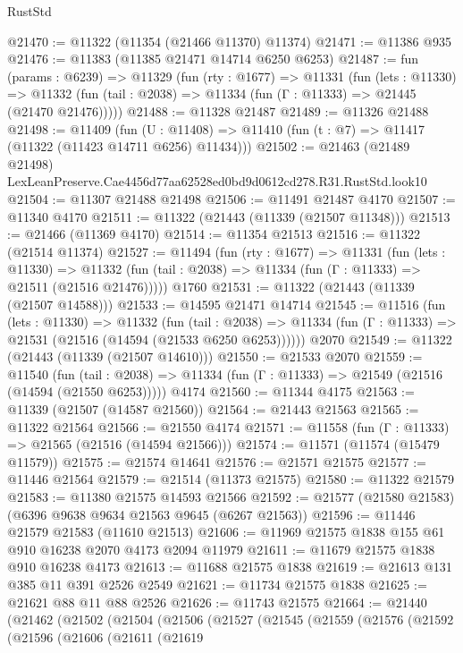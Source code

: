 \begin{lexlean}{RustStd}
\begin{coremodule}
@21470 := @11322 (@11354 (@21466 @11370) @11374)
@21471 := @11386 @935
@21476 := @11383 (@11385 @21471 @14714 @6250 @6253)
@21487 := fun (params : @6239) =>
  @11329
    (fun (rty : @1677) =>
    @11331
      (fun (lets : @11330) =>
      @11332 (fun (tail : @2038) => @11334 (fun (Γ : @11333) => @21445 (@21470 @21476)))))
@21488 := @11328 @21487
@21489 := @11326 @21488
@21498 := @11409
    (fun (U : @11408) => @11410 (fun (t : @7) => @11417 (@11322 (@11423 @14711 @6256) @11434)))
@21502 := @21463
    (@21489 @21498)
    LexLeanPreserve.Cae4456d77aa62528ed0bd9d0612cd278.R31.RustStd.look10
@21504 := @11307 @21488 @21498
@21506 := @11491 @21487 @4170
@21507 := @11340 @4170
@21511 := @11322 (@21443 (@11339 (@21507 @11348)))
@21513 := @21466 (@11369 @4170)
@21514 := @11354 @21513
@21516 := @11322 (@21514 @11374)
@21527 := @11494
    (fun (rty : @1677) =>
    @11331
      (fun (lets : @11330) =>
      @11332 (fun (tail : @2038) => @11334 (fun (Γ : @11333) => @21511 (@21516 @21476)))))
    @1760
@21531 := @11322 (@21443 (@11339 (@21507 @14588)))
@21533 := @14595 @21471 @14714
@21545 := @11516
    (fun (lets : @11330) =>
    @11332
      (fun (tail : @2038) =>
      @11334 (fun (Γ : @11333) => @21531 (@21516 (@14594 (@21533 @6250 @6253))))))
    @2070
@21549 := @11322 (@21443 (@11339 (@21507 @14610)))
@21550 := @21533 @2070
@21559 := @11540
    (fun (tail : @2038) => @11334 (fun (Γ : @11333) => @21549 (@21516 (@14594 (@21550 @6253)))))
    @4174
@21560 := @11344 @4175
@21563 := @11339 (@21507 (@14587 @21560))
@21564 := @21443 @21563
@21565 := @11322 @21564
@21566 := @21550 @4174
@21571 := @11558 (fun (Γ : @11333) => @21565 (@21516 (@14594 @21566)))
@21574 := @11571 (@11574 (@15479 @11579))
@21575 := @21574 @14641
@21576 := @21571 @21575
@21577 := @11446 @21564
@21579 := @21514 (@11373 @21575)
@21580 := @11322 @21579
@21583 := @11380 @21575 @14593 @21566
@21592 := @21577 (@21580 @21583) (@6396 @9638 @9634 @21563 @9645 (@6267 @21563))
@21596 := @11446 @21579 @21583 (@11610 @21513)
@21606 := @11969 @21575 @1838 @155 @61 @910 @16238 @2070 @4173 @2094 @11979
@21611 := @11679 @21575 @1838 @910 @16238 @4173
@21613 := @11688 @21575 @1838
@21619 := @21613 @131 @385 @11 @391 @2526 @2549
@21621 := @11734 @21575 @1838
@21625 := @21621 @88 @11 @88 @2526
@21626 := @11743 @21575
@21664 := @21440
    (@21462
      (@21502
        (@21504
          (@21506
            (@21527
              (@21545
                (@21559
                  (@21576
                    (@21592
                      (@21596
                        (@21606
                          (@21611
                            (@21619

\end{coremodule}
\end{lexlean}
